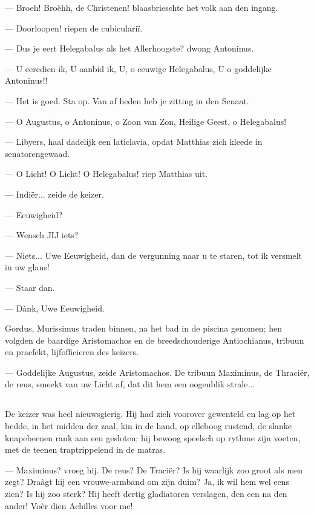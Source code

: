 \documentclass[a4paper, 12pt, oneside, dutch]{article}
\begin{document}
--- Broeh! Broèhh, de Christenen! blaasbrieschte het volk aan den ingang.

--- Doorloopen! riepen de cubiculariï.

--- Dus je eert Helegabalus als het Allerhoogste? dwong Antoninus.

--- U eeredien ik, U aanbid ik, U, o eeuwige Helegabalus, U o goddelijke Antoninus!!

--- Het is goed. Sta op. Van af heden heb je zitting in den Senaat.

--- O Augustus, o Antoninus, o Zoon van Zon, Heilige Geest, o Helegabalus!

--- Libyers, haal dadelijk een laticlavia, opdat Matthias zich kleede in senatorengewaad.

--- O Licht! O Licht! O Helegabalus! riep Matthias uit.

--- Indiër... zeide de keizer.

--- Eeuwigheid?

--- Wensch JIJ iets?

--- Niets... Uwe Eeuwigheid, dan de vergunning naar u te staren, tot ik versmelt in uw glans!

--- Staar dan.

--- Dànk, Uwe Eeuwigheid.

Gordus, Murissimus traden binnen, na het bad in de piscina genomen; hen volgden de baardige Aristomachos en de breedschouderige Antiochianus, tribuun en praefekt, lijfofficieren des keizers.

--- Goddelijke Augustus, zeide Aristomachos. De tribuun Maximinus, de Thraciër, de reus, smeekt van uw Licht af, dat dit hem een oogenblik strale...

\subsection{}
\paragraph{}
De keizer was heel nieuwsgierig. Hij had zich voorover gewenteld en lag op het bedde, in het midden der zaal, kin in de hand, op elleboog rustend, de slanke knapebeenen rank aan een gesloten; hij bewoog speelsch op rythme zijn voeten, met de teenen traptrippelend in de matras.

--- Maximinus? vroeg hij. De reus? De Traciër? Is hij waarlijk zoo groot als men zegt? Draàgt hij een vrouwe-armband om zijn duim? Ja, ik wil hem wel eens zien? Is hij zoo sterk? Hij heeft dertig gladiatoren verslagen, den een na den ander! Voèr dien Achilles voor me!
\end{document}
